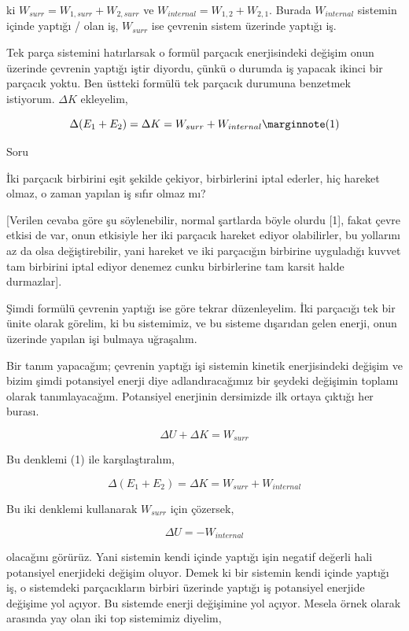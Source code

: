 \documentclass[12pt,fleqn]{article}\usepackage{../../common}
\begin{document}
ki $W_{surr} = W_{1, surr} + W_{2, surr}$ ve
$W_{internal}=W_{1,2}+W_{2,1}$. Burada $W_{internal}$ sistemin içinde yaptığı /
olan iş, $W_{surr}$ ise çevrenin sistem üzerinde yaptığı iş.

Tek parça sistemini hatırlarsak o formül parçacık enerjisindeki değişim onun
üzerinde çevrenin yaptığı iştir diyordu, çünkü o durumda iş yapacak ikinci bir
parçacık yoktu. Ben üstteki formülü tek parçacık durumuna benzetmek
istiyorum. $\Delta K$ ekleyelim,

$$
\Delta (E_1 + E_2) = \Delta K = W_{surr} + W_{internal} 
\mlabel{1}
$$

Soru

İki parçacık birbirini eşit şekilde çekiyor, birbirlerini iptal ederler, hiç
hareket olmaz, o  zaman yapılan iş sıfır olmaz mı?

[Verilen cevaba göre şu söylenebilir, normal şartlarda böyle olurdu [1], fakat
 çevre etkisi de var, onun etkisiyle her iki parçacık hareket ediyor
 olabilirler, bu yollarını az da olsa değiştirebilir, yani hareket ve iki
 parçacığın birbirine uyguladığı kuvvet tam birbirini iptal ediyor denemez cunku
birbirlerine tam karsit halde durmazlar].

Şimdi formülü çevrenin yaptığı ise göre tekrar düzenleyelim. İki parçacığı tek
bir ünite olarak görelim, ki bu sistemimiz, ve bu sisteme dışarıdan gelen
enerji, onun üzerinde yapılan işi bulmaya uğraşalım. 

Bir tanım yapacağım; çevrenin yaptığı işi sistemin kinetik enerjisindeki değişim
ve bizim şimdi potansiyel enerji diye adlandıracağımız bir şeydeki değişimin
toplamı olarak tanımlayacağım. Potansiyel enerjinin dersimizde ilk ortaya
çıktığı her burası.

$$
\Delta U + \Delta K = W_{surr} 
$$

Bu denklemi (1) ile karşılaştıralım,

$$
\Delta (E_1 + E_2) = \Delta K = W_{surr} + W_{internal}
$$

Bu iki denklemi kullanarak $W_{surr}$ için çözersek,

$$
\Delta U = -W_{internal}
$$

olacağını görürüz. Yani sistemin kendi içinde yaptığı işin negatif değerli hali
potansiyel enerjideki değişim oluyor. Demek ki bir sistemin kendi içinde yaptığı
iş, o sistemdeki parçacıkların birbiri üzerinde yaptığı iş potansiyel enerjide
değişime yol açıyor. Bu sistemde enerji değişimine yol açıyor. Mesela örnek
olarak arasında yay olan iki top sistemimiz diyelim,
\end{document}
